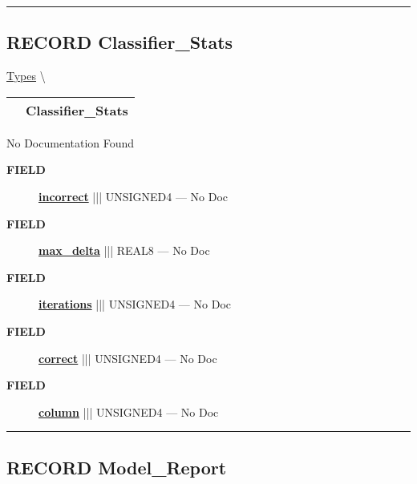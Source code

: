 \rule{\linewidth}{0.5pt}
\subsection*{\textsf{\colorbox{headtoc}{\color{white} RECORD}
Classifier\_Stats}}

\hypertarget{ecldoc:logisticregression.types.classifier_stats}{}
\hspace{0pt} \hyperlink{ecldoc:LogisticRegression.Types}{Types} \textbackslash 

{\renewcommand{\arraystretch}{1.5}
\begin{tabularx}{\textwidth}{|>{\raggedright\arraybackslash}l|X|}
\hline
\hspace{0pt}\mytexttt{\color{red} } & \textbf{Classifier\_Stats} \\
\hline
\end{tabularx}
}

\par





No Documentation Found







\par
\begin{description}
\item [\colorbox{tagtype}{\color{white} \textbf{\textsf{FIELD}}}] \textbf{\underline{incorrect}} ||| UNSIGNED4 --- No Doc
\item [\colorbox{tagtype}{\color{white} \textbf{\textsf{FIELD}}}] \textbf{\underline{max\_delta}} ||| REAL8 --- No Doc
\item [\colorbox{tagtype}{\color{white} \textbf{\textsf{FIELD}}}] \textbf{\underline{iterations}} ||| UNSIGNED4 --- No Doc
\item [\colorbox{tagtype}{\color{white} \textbf{\textsf{FIELD}}}] \textbf{\underline{correct}} ||| UNSIGNED4 --- No Doc
\item [\colorbox{tagtype}{\color{white} \textbf{\textsf{FIELD}}}] \textbf{\underline{column}} ||| UNSIGNED4 --- No Doc
\end{description}





\rule{\linewidth}{0.5pt}
\subsection*{\textsf{\colorbox{headtoc}{\color{white} RECORD}
Model\_Report}}

